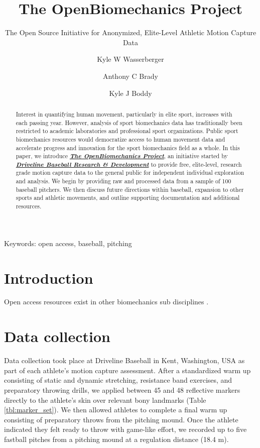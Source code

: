 \documentclass[
]{article}
\author[1,$\dagger$]{\footnotesize Kyle W Wasserberger}
\author[1]{\footnotesize Anthony C Brady}
\author[1]{\footnotesize Kyle J Boddy}
\affil[1]{\footnotesize Research \& Development; Driveline Baseball}
\affil[$\dagger$]{\footnotesize Corresponding author: kyle.wasserberger@drivelinebaseball.com}
\title{The OpenBiomechanics Project}
\subtitle{The Open Source Initiative for Anonymized, Elite-Level Athletic Motion Capture Data}
\date{\vspace{-2.5em}}
\begin{document}
\maketitle

\begin{center}
Keywords: open access, baseball, pitching
\end{center}

\bigskip
\bigskip
\linenumbers
\doublespacing
\begin{abstract}
Interest in quantifying human movement, particularly in elite sport, increases with each passing year. However, analysis of sport biomechanics data has traditionally been restricted to academic laboratories and professional sport organizations. Public sport biomechanics resources would democratize access to human movement data and accelerate progress and innovation for the sport biomechanics field as a whole. In this paper, we introduce \href{www.openbiomechanics.org}{\textbf{\textit{The OpenBiomechanics Project}}}, an initiative started by \href{https://www.drivelinebaseball.com/research/}{\textbf{\textit{Driveline Baseball Research \& Development}}} to provide free, elite-level, research grade motion capture data to the general public for independent individual exploration and analysis. We begin by providing raw and processed data from a sample of 100 baseball pitchers. We then discuss future directions within baseball, expansion to other sports and athletic movements, and outline supporting documentation and additional resources.
\end{abstract}

\newpage

\hypertarget{introduction}{%
\section{Introduction}\label{introduction}}

Open access resources exist in other biomechanics sub disciplines \cite{camargo2021comprehensive, erdemir2016open}.

\hypertarget{data-collection}{%
\section{Data collection}\label{data-collection}}

Data collection took place at Driveline Baseball in Kent, Washington, USA as part of each athlete's motion capture assessment. After a standardized warm up consisting of static and dynamic stretching, resistance band exercises, and preparatory throwing drills, we applied between 45 and 48 reflective markers directly to the athlete's skin over relevant bony landmarks (Table \ref{tbl:marker_set}). We then allowed athletes to complete a final warm up consisting of preparatory throws from the pitching mound. Once the athlete indicated they felt ready to throw with game-like effort, we recorded up to five fastball pitches from a pitching mound at a regulation distance (18.4 m).
\end{document}
